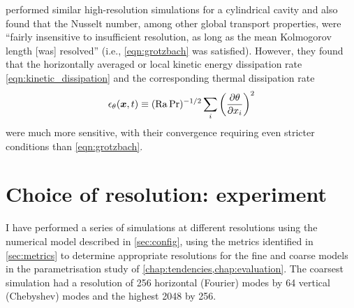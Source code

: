 \documentclass[../main.tex]{subfiles}
\begin{document}
\textcite{scheel2013} performed similar high-resolution simulations for a
cylindrical cavity and also found that the Nusselt number, among other global
transport properties, were ``fairly insensitive to insufficient resolution, as
long as the mean Kolmogorov length [was] resolved'' (i.e., \cref{eqn:grotzbach}
was satisfied). However, they found that the horizontally averaged or local
kinetic energy dissipation rate \cref{eqn:kinetic_dissipation} and the
corresponding thermal dissipation rate
\begin{equation}
    \label{eqn:thermal_dissipation}
    \epsilon_\theta(\bm{x}, t) \equiv
        (\mathrm{Ra}\,\mathrm{Pr})^{-1/2} \sum_i \left(\frac{\partial \theta}{\partial x_i}\right)^2
\end{equation}
were much more sensitive, with their convergence requiring even stricter
conditions than \cref{eqn:grotzbach}.


\section{Choice of resolution: experiment} \label{sec:choose_resolution}
I have performed a series of simulations at different resolutions using the
numerical model described in \cref{sec:config}, using the metrics identified in
\cref{sec:metrics} to determine appropriate resolutions for the fine and coarse
models in the parametrisation study of
\cref{chap:tendencies,chap:evaluation}. The coarsest simulation had a
resolution of 256 horizontal (Fourier) modes by 64 vertical (Chebyshev) modes
and the highest 2048 by 256.
\end{document}
